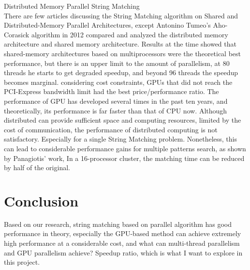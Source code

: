 \documentclass[11pt]{article}       %
\begin{document}
Distributed Memory Parallel String Matching\\
There are few articles discussing the String Matching algorithm on Shared and Distributed-Memory Parallel Architectures, except Antonino Tumeo's Aho-Corasick algorithm in 2012 compared and analyzed the distributed memory architecture and shared memory architecture\cite{Distributed-Memory}. Results at the time showed that shared-memory architectures based on multiprocessors were the theoretical best performance, but there is an upper limit to the amount of parallelism, at 80 threads he starts to get degraded speedup, and beyond 96 threads the speedup becomes marginal. considering cost constraints, GPUs that did not reach the PCI-Express bandwidth limit had the best price/performance ratio. The performance of GPU has developed several times in the past ten years, and theoretically, its performance is far faster than that of CPU now. Although distributed can provide sufficient space and computing resources, limited by the cost of communication, the performance of distributed computing is not satisfactory. Especially for a single String Matching problem. Nonetheless, this can lead to considerable performance gains for multiple patterns search, as shown by Panagiotis' work\cite{MPI}, In a 16-processor cluster, the matching time can be reduced by half of the original.\\


\section{Conclusion} \label{Conclu}

Based on our research, string matching based on parallel algorithm has good performance in theory, especially the GPU-based method can achieve extremely high performance at a considerable cost, and what can multi-thread parallelism and GPU parallelism achieve? Speedup ratio, which is what I want to explore in this project.
\end{document}
